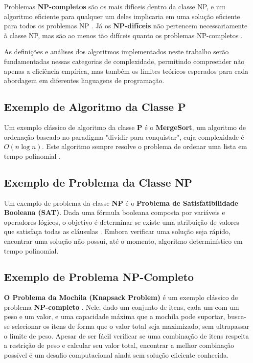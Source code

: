 \documentclass[12pt,oneside,a4paper]{report}
\begin{document}
Problemas \textbf{NP-completos} são os mais difíceis dentro da classe NP, e um algoritmo eficiente para qualquer um deles implicaria em uma solução eficiente para todos os problemas NP \cite{garey1979}. Já os \textbf{NP-difíceis} não pertencem necessariamente à classe NP, mas são ao menos tão difíceis quanto os problemas NP-completos \cite{garey1979, sipser2012}.

As definições e análises dos algoritmos implementados neste trabalho serão fundamentadas nessas categorias de complexidade, permitindo compreender não apenas a eficiência empírica, mas também os limites teóricos esperados para cada abordagem em diferentes linguagens de programação.

\subsection{Exemplo de Algoritmo da Classe P}

Um exemplo clássico de algoritmo da classe \textbf{P} é o \textbf{MergeSort}, um algoritmo de ordenação baseado no paradigma "dividir para conquistar", cuja complexidade é \( O(n \log n) \). Este algoritmo sempre resolve o problema de ordenar uma lista em tempo polinomial \cite{cormen2022, knuth1998}.

\subsection{Exemplo de Problema da Classe NP}

Um exemplo de problema da classe \textbf{NP} é o \textbf{Problema de Satisfatibilidade Booleana (SAT)}. Dada uma fórmula booleana composta por variáveis e operadores lógicos, o objetivo é determinar se existe uma atribuição de valores que satisfaça todas as cláusulas \cite{garey1979}. Embora verificar uma solução seja rápido, encontrar uma solução não possui, até o momento, algoritmo determinístico em tempo polinomial.

\subsection{Exemplo de Problema NP-Completo}

\textbf{O Problema da Mochila (Knapsack Problem)} é um exemplo clássico de problema \textbf{NP-completo} \cite{garey1979}. Nele, dado um conjunto de itens, cada um com um peso e um valor, e uma capacidade máxima que a mochila pode suportar, busca-se selecionar os itens de forma que o valor total seja maximizado, sem ultrapassar o limite de peso. Apesar de ser fácil verificar se uma combinação de itens respeita a restrição de peso e calcular seu valor total, encontrar a melhor combinação possível é um desafio computacional ainda sem solução eficiente conhecida.
\end{document}
